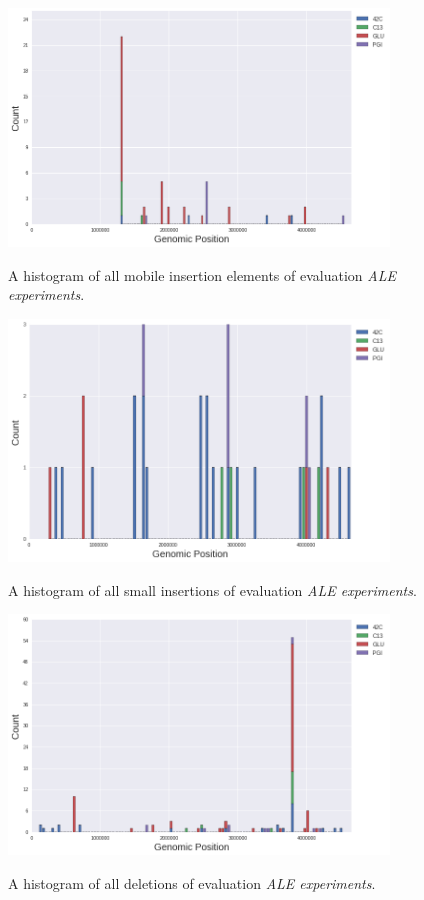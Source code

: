 \documentclass[12pt,final,masters,chapterheads]{ucsd}  %
\begin{document}
\begin{figure}[H]
  \caption{A histogram of all mobile insertion elements of evaluation \textit{ALE experiments}.}
  \centering
  \includegraphics[width=0.9\textwidth]{all_mobs_topo.png}
  \label{fig:all_mobs_topo}
\end{figure}
\begin{figure}[H]
  \caption{A histogram of all small insertions of evaluation \textit{ALE experiments}.}
  \centering
  \includegraphics[width=0.9\textwidth]{all_ins_topo.png}
  \label{fig:all_ins_topo}
\end{figure}
\begin{figure}[H]
  \caption{A histogram of all deletions of evaluation \textit{ALE experiments}.}
  \centering
  \includegraphics[width=0.9\textwidth]{all_dels_topo.png}
  \label{fig:all_dels_topo}
\end{figure}
\end{document}
